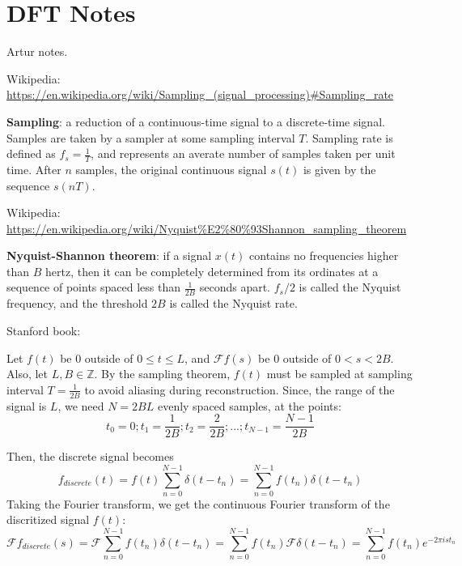 \documentclass{article}
\begin{document}
\section{DFT Notes}
Artur notes.

Wikipedia: \url{https://en.wikipedia.org/wiki/Sampling_(signal_processing)#Sampling_rate}

\textbf{Sampling}: a reduction of a continuous-time signal to a discrete-time signal. Samples are taken by a sampler at some sampling interval $T$. Sampling rate is defined as $f_s = \frac{1}{T}$, and represents an averate number of samples taken per unit time. After $n$ samples, the original continuous signal $s(t)$ is given by the sequence ${s(nT)}$.



Wikipedia: \url{https://en.wikipedia.org/wiki/Nyquist%E2%80%93Shannon_sampling_theorem}

\textbf{Nyquist-Shannon theorem}: if a signal $x(t)$ contains no frequencies higher than $B$ hertz, then it can be completely determined from its ordinates at a sequence of points spaced less than $\frac{1}{2B}$ seconds apart. $f_s/2$ is called the Nyquist frequency, and the threshold $2B$ is called the Nyquist rate. 

Stanford book:

Let $f(t)$ be $0$ outside of $0 \le t \le L$, and $\mathscr{F}{f(s)}$ be $0$ outside of $0 < s < 2B$. Also, let $L, B \in \mathbb{Z}$.
By the sampling theorem, $f(t)$ must be sampled at sampling interval $T = \frac{1}{2B}$ to avoid aliasing during reconstruction. Since, the range of the signal is $L$, we need $N = 2BL$ evenly spaced samples, at the points:
\begin{equation}
    t_0 = 0; t_1 = \frac{1}{2B}; t_2 = \frac{2}{2B}; ...; t_{N-1} = \frac{N-1}{2B}
\end{equation}

Then, the discrete signal becomes
\begin{equation}
    f_{discrete}(t) = f(t) \sum_{n=0}^{N-1} \delta(t-t_n) = \sum_{n=0}^{N-1} f(t_n) \delta(t-t_n)
\end{equation}
Taking the Fourier transform, we get the continuous Fourier transform of the discritized signal $f(t)$:
\begin{equation}
    \mathscr{F}f_{discrete} (s) = \mathscr{F} \sum_{n=0}^{N-1} f(t_n) \delta(t-t_n) = \sum_{n=0}^{N-1} f(t_n) \mathscr{F} \delta(t-t_n) = \sum_{n=0}^{N-1} f(t_n) e^{-2\pi ist_n}
\end{equation} 
\end{document}
